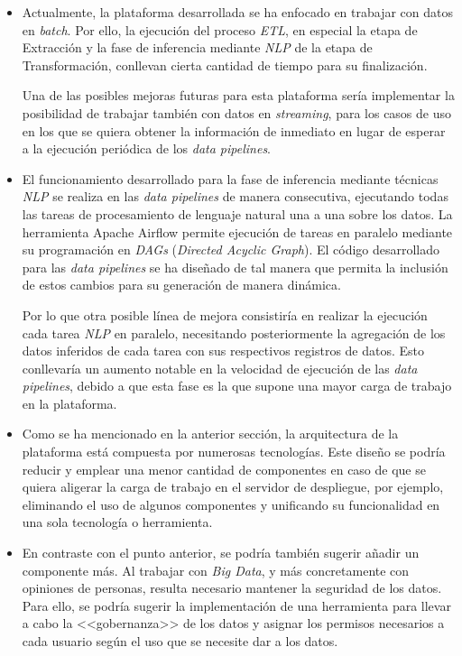 \begin{itemize}
    \item Actualmente, la plataforma desarrollada se ha enfocado en trabajar con datos en \textit{batch}. Por ello, la ejecución del proceso \textit{ETL}, en especial la etapa de Extracción y la fase de inferencia mediante \textit{NLP} de la etapa de Transformación, conllevan cierta cantidad de tiempo para su finalización.
    
    Una de las posibles mejoras futuras para esta plataforma sería implementar la posibilidad de trabajar también con datos en \textit{streaming}, para los casos de uso en los que se quiera obtener la información de inmediato en lugar de esperar a la ejecución periódica de los \textit{data pipelines}.

    \item El funcionamiento desarrollado para la fase de inferencia mediante técnicas \textit{NLP} se realiza en las \textit{data pipelines} de manera consecutiva, ejecutando todas las tareas de procesamiento de lenguaje natural una a una sobre los datos. La herramienta Apache Airflow permite ejecución de tareas en paralelo mediante su programación en \textit{DAGs} (\textit{Directed Acyclic Graph}). El código desarrollado para las \textit{data pipelines} se ha diseñado de tal manera que permita la inclusión de estos cambios para su generación de manera dinámica.
    
    Por lo que otra posible línea de mejora consistiría en realizar la ejecución cada tarea \textit{NLP} en paralelo, necesitando posteriormente la agregación de los datos inferidos de cada tarea con sus respectivos registros de datos. Esto conllevaría un aumento notable en la velocidad de ejecución de las \textit{data pipelines}, debido a que esta fase es la que supone una mayor carga de trabajo en la plataforma.

    \item Como se ha mencionado en la anterior sección, la arquitectura de la plataforma está compuesta por numerosas tecnologías. Este diseño se podría reducir y emplear una menor cantidad de componentes en caso de que se quiera aligerar la carga de trabajo en el servidor de despliegue, por ejemplo, eliminando el uso de algunos componentes y unificando su funcionalidad en una sola tecnología o herramienta.

    \item En contraste con el punto anterior, se podría también sugerir añadir un componente más. Al trabajar con \textit{Big Data}, y más concretamente con opiniones de personas, resulta necesario mantener la seguridad de los datos. Para ello, se podría sugerir la implementación de una herramienta para llevar a cabo la <<gobernanza>> de los datos y asignar los permisos necesarios a cada usuario según el uso que se necesite dar a los datos.


\end{itemize}
